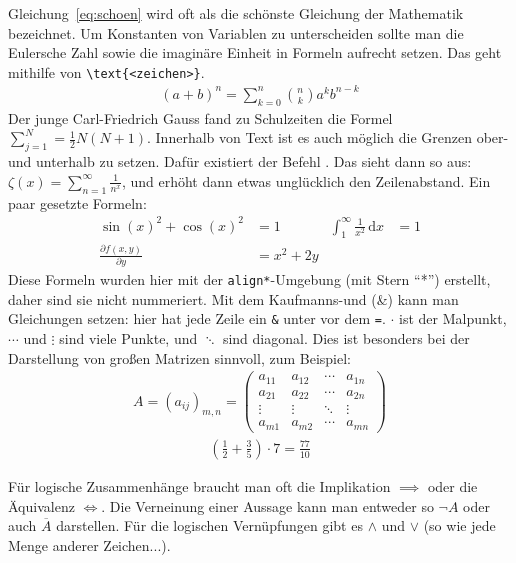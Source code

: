 Gleichung~\eqref{eq:schoen} wird oft als die schönste Gleichung der Mathematik bezeichnet.
Um Konstanten von Variablen zu unterscheiden sollte man die Eulersche Zahl sowie
die imaginäre Einheit in Formeln aufrecht setzen. Das geht mithilfe von
\newline
\lstinline!\text{<zeichen>}!.
%
\begin{align}
	\label{eq:binomial}(a+b)^{n}= \sum_{k = 0}^{n}\binom{n}{k}a^{k}b^{n-k}
\end{align}
%
Der junge Carl-Friedrich Gauss fand zu Schulzeiten die Formel
$\sum_{j = 1}^{N}= \frac{1}{2}N(N+1)$. Innerhalb von Text ist es auch möglich die
Grenzen ober- und unterhalb zu setzen. Dafür existiert der Befehl {}.
Das sieht dann so aus: $\zeta(x) = \sum\limits_{n=1}^{\infty}\frac{1}{n^{x}}$,
und erhöht dann etwas unglücklich den Zeilenabstand. Ein paar gesetzte Formeln: %
%
\begin{align*}
	\sin(x)^{2}+ \cos(x)^{2}            & = 1        & \int_{1}^{\infty}\frac{1}{x^{2}}\, \textrm{d}x & = 1 \\
	\frac{\partial f(x, y)}{\partial y} & = x^{2}+ 2y
\end{align*}
%
Diese Formeln wurden hier mit der \texttt{align*}-Umgebung (mit Stern "`*"')
erstellt, daher sind sie nicht nummeriert. Mit dem Kaufmanns-und (\&) kann man
Gleichungen setzen: hier hat jede Zeile ein \texttt{\&} unter vor dem \texttt{=}.
$\cdot$ ist der Malpunkt, $\cdots$ und $\vdots$ sind viele Punkte, und $\ddots$
sind diagonal. Dies ist besonders bei der Darstellung von großen Matrizen sinnvoll,
zum Beispiel:
%
\begin{align*}
	A= (a_{ij})_{m,n}= \begin{pmatrix}a_{11}&a_{12}&\cdots&a_{1n}\\ a_{21}&a_{22}&\cdots&a_{2n}\\ \vdots&\vdots&\ddots&\vdots \\ a_{m1}&a_{m2}&\cdots&a_{mn}\end{pmatrix}
\end{align*}
%
\begin{align*}
	\left(\frac{1}{2}+ \frac{3}{5}\right) \cdot 7 = \frac{77}{10}
\end{align*}

Für logische Zusammenhänge braucht man oft die Implikation $\implies$ oder die
Äquivalenz $\iff$. Die Verneinung einer Aussage kann man entweder so $\neg A$ oder
auch $\overline{A}$ darstellen. Für die logischen Vernüpfungen gibt es $\wedge$
und $\vee$ (so wie jede Menge anderer Zeichen...).

